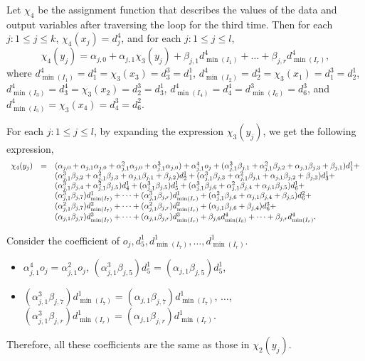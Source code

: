 \documentclass[runningheads,a4paper]{llncs}
\begin{document}
Let $\chi_4$ be the assignment function that describes the values of the data and output variables after traversing the loop for the third time. Then for each $j: 1 \le j \le k$, $\chi_4(x_j)=d^4_j$, and for each $j: 1 \le j \le l$, 
\[\chi_4(y_j) = \alpha_{j,0} + \alpha_{j,1} \chi_3(y_j) + \beta_{j,1} d^4_{\min(I_1)} + \dots + \beta_{j,r} d^4_{\min(I_r)},\]
where $d^4_{\min(I_1)}=d^4_1 = \chi_3(x_3)=d^3_3=d^1_1$, $d^4_{\min(I_2)}=d^4_2 = \chi_3(x_1)=d^3_1=d^1_2$, $d^4_{\min(I_3)}=d^4_3 = \chi_3(x_2)=d^3_2=d^1_3$, $d^4_{\min(I_4)}=d^4_4 = d^3_{\min(I_6)}=d^3_6$, and $d^4_{\min(I_5)}=\chi_3(x_4)=d^3_4=d^2_6$.

For each $j: 1 \le j \le l$, 
by expanding the expression $\chi_3(y_j)$, we  get the following expression, 
\[
\begin{array}{l c l}
\chi_4(y_j) & = & (\alpha_{j,0} + \alpha_{j,1} \alpha_{j,0}+ \alpha^2_{j,1} \alpha_{j,0}+\alpha^3_{j,1} \alpha_{j,0}) + \alpha^4_{j,1}  o_j + (\alpha^3_{j,1} \beta_{j,1}+ \alpha^2_{j,1}\beta_{j,2} + \alpha_{j,1}\beta_{j,3} + \beta_{j,1}) d^1_1 + \\
& & (\alpha^3_{j,1} \beta_{j,2}+\alpha^2_{j,1}\beta_{j,3} + \alpha_{j,1}\beta_{j,1} + \beta_{j,2}) d^1_2 + (\alpha^3_{j,1} \beta_{j,3} + \alpha^2_{j,1}\beta_{j,1} + \alpha_{j,1}\beta_{j,2} +\beta_{j,3}) d^1_3 + \\
& & (\alpha^3_{j,1} \beta_{j,4}+\alpha^2_{j,1}\beta_{j,5}) d^1_4 + (\alpha^3_{j,1} \beta_{j,5}) d^1_5 + (\alpha^3_{j,1} \beta_{j,6}+\alpha^2_{j,1}\beta_{j,4}+\alpha_{j,1}\beta_{j,5})d^1_6 + \\
& & (\alpha^3_{j,1} \beta_{j,7}) d^1_{\min(I_7)}+ \dots + (\alpha^3_{j,1} \beta_{j,r}) d^1_{\min(I_r)} + 
 (\alpha^2_{j,1}\beta_{j,6}+\alpha_{j,1}\beta_{j,4} + \beta_{j,5}) d^2_{6} + \\
 & & (\alpha^2_{j,1}\beta_{j,7}) d^2_{\min(I_7)} + \dots + (\alpha^2_{j,1}\beta_{j,r}) d^2_{\min(I_r)}+  (\alpha_{j,1}\beta_{j,6}+\beta_{j,4}) d^3_{6} +  \\
 & & (\alpha_{j,1}\beta_{j,7}) d^3_{\min(I_7)} + \dots + (\alpha_{j,1}\beta_{j,r}) d^3_{\min(I_r)} + \beta_{j,6} d^4_{\min(I_6)} + \dots +  \beta_{j,r} d^4_{\min(I_r)}.
\end{array}
\] 

Consider the coefficient of $o_j, d^1_5, d^1_{\min(I_7)},\dots,d^1_{\min(I_r)}$.
\begin{itemize}
\item $\alpha^4_{j,1}o_j = \alpha^2_{j,1}o_j$, $(\alpha^3_{j,1} \beta_{j,5}) d^1_5 = (\alpha_{j,1} \beta_{j,5}) d^1_5$,
\item $(\alpha^3_{j,1} \beta_{j,7}) d^1_{\min(I_7)}= (\alpha_{j,1} \beta_{j,7}) d^1_{\min(I_7)}$, $\dots$, $(\alpha^3_{j,1} \beta_{j,r}) d^1_{\min(I_r)}= (\alpha_{j,1} \beta_{j,r}) d^1_{\min(I_r)}$.
\end{itemize}
Therefore, all these coefficients are the same as those in $\chi_2(y_j)$.
\end{document}
